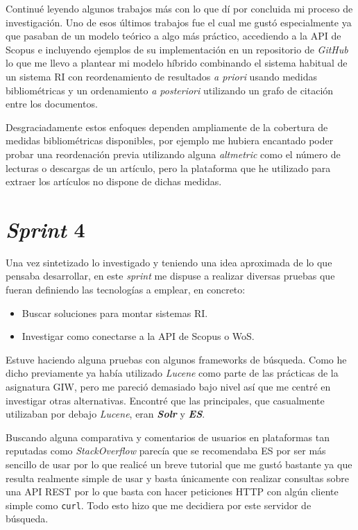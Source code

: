 Continué leyendo algunos trabajos más con lo que dí por concluida mi proceso de investigación. Uno de esos últimos trabajos fue \cite{DBLP:conf/ecir/SarolLS18} el cual me gustó especialmente ya que pasaban de un modelo teórico a algo más práctico, accediendo a la \acrshort{API} de Scopus e incluyendo ejemplos de su implementación en un repositorio de \textit{GitHub} lo que me llevo a plantear mi modelo híbrido combinando el sistema habitual de un sistema \acrshort{RI} con reordenamiento de resultados \textit{a priori} usando medidas bibliométricas y un ordenamiento \textit{a posteriori} utilizando un grafo de citación entre los documentos.

Desgraciadamente estos enfoques dependen ampliamente de la cobertura de medidas bibliométricas disponibles, por ejemplo me hubiera encantado poder probar una reordenación previa utilizando alguna \textit{altmetric} como el número de lecturas o descargas de un artículo, pero la plataforma que he utilizado para extraer los artículos no dispone de dichas medidas.

\section{\textit{Sprint} 4}
\label{sc:sprint4}
Una vez sintetizado lo investigado y teniendo una idea aproximada de lo que pensaba desarrollar, en este \textit{sprint} me dispuse a realizar diversas pruebas que fueran definiendo las tecnologías a emplear, en concreto:
\begin{itemize}
	\item Buscar soluciones para montar sistemas \acrshort{RI}.
	\item Investigar como conectarse a la \acrshort{API} de Scopus o \acrshort{WoS}.
\end{itemize}

Estuve haciendo alguna pruebas con algunos \glspl{framework} de búsqueda. Como he dicho previamente ya había utilizado \textit{Lucene} como parte de las prácticas de la asignatura \acrshort{GIW}, pero me pareció demasiado bajo nivel así que me centré en investigar otras alternativas. Encontré que las principales, que casualmente utilizaban por debajo \textit{Lucene}, eran \textit{\textbf{Solr}} y \textit{\textbf{\acrlong{ES}}}.

Buscando alguna comparativa \cite{ES_Solr} y comentarios de usuarios en plataformas tan reputadas como \textit{StackOverflow} \cite{ES_Solr_SO} parecía que se recomendaba \acrshort{ES} por ser más sencillo de usar por lo que realicé un breve tutorial \cite{ES_tutorial} que me gustó bastante ya que resulta realmente simple de usar y basta únicamente con realizar consultas sobre una \acrshort{API} \acrshort{REST} por lo que basta con hacer peticiones \acrshort{HTTP} con algún cliente simple como \texttt{curl}. Todo esto hizo que me decidiera por este servidor de búsqueda.

